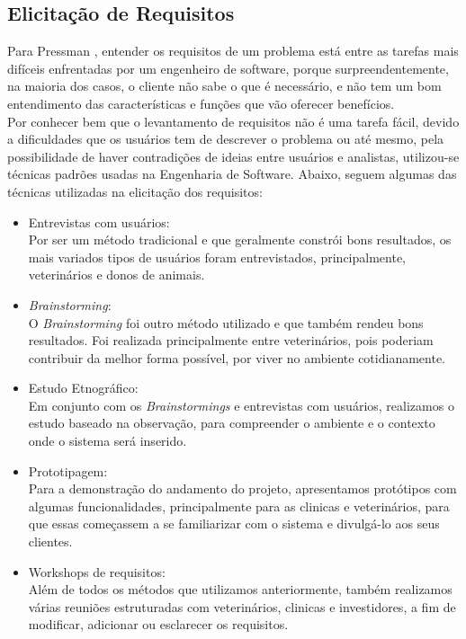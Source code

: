 \subsection{Elicitação de Requisitos}
Para Pressman \cite{Pressman2006}, entender os requisitos de um problema está entre as tarefas mais difíceis enfrentadas por um engenheiro de software, porque surpreendentemente, na maioria dos casos, o cliente não sabe o que é necessário, e não tem um bom entendimento das características e funções que vão oferecer benefícios.
\\
\indent
Por conhecer bem que o levantamento de requisitos não é uma tarefa fácil, devido a dificuldades que os usuários tem de descrever o problema ou até mesmo, pela possibilidade de haver contradições de ideias entre usuários e analistas, utilizou-se técnicas padrões usadas na Engenharia de Software. Abaixo, seguem algumas das técnicas utilizadas na elicitação dos requisitos:
\begin{itemize}
   \item Entrevistas com usuários:
   \\
   \indent
   Por ser um método tradicional e que geralmente constrói bons resultados, os mais variados tipos de usuários foram entrevistados, principalmente, veterinários e donos de animais. 
   \item {\it Brainstorming}:
    \\
   \indent
   O {\it Brainstorming} foi outro método utilizado e que também rendeu bons resultados. Foi realizada principalmente entre veterinários, pois poderiam contribuir da melhor forma possível, por viver no ambiente cotidianamente. 
   \item Estudo Etnográfico:
   \\
   \indent
   Em conjunto com os {\it Brainstormings} e entrevistas com usuários, realizamos o estudo baseado na observação, para compreender o ambiente e o contexto onde o sistema será inserido.
   \item Prototipagem: 
   \\
   \indent
   Para a demonstração do andamento do projeto, apresentamos protótipos com algumas funcionalidades, principalmente para as clinicas e veterinários, para que essas começassem a se familiarizar com o sistema e divulgá-lo aos seus clientes.
   \item Workshops de requisitos:
   \\
   \indent
   Além de todos os métodos que utilizamos anteriormente, também realizamos várias reuniões estruturadas com veterinários, clinicas e investidores, a fim de modificar, adicionar ou esclarecer os requisitos.
 \end{itemize}
 
